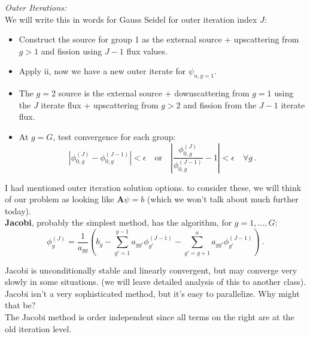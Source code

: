 \documentclass[12pt]{article}
\newcommand{\ve}[1]{\ensuremath{\mathbf{#1}}}
\begin{document}
\textit{Outer Iterations:} \\
We will write this in words for Gauss Seidel for outer iteration index $J$:
%
\begin{itemize}
\item Construct the source for group 1 as the external source + upscattering from $g>1$ and fission using $J-1$ flux values.
\item Apply ii, now we have a new outer iterate for $\psi_{n,g=1}$.
\item The $g=2$ source is the external source + downscattering from $g=1$ using the $J$ iterate flux + upscattering from $g>2$ and fission from the $J-1$ iterate flux. 
\item At $g=G$, test convergence for each group:
\[
|\phi_{0,g}^{(J)} - \phi_{0,g}^{(J-1)}| < \epsilon \quad \text{or} \quad |\frac{\phi_{0,g}^{(J)}}{\phi_{0,g}^{(J-1)}} - 1| < \epsilon \quad \forall g \:.
\]
\end{itemize}
I had mentioned outer iteration solution options. to consider these, we will think of our problem as looking like $\ve{A} \psi = b$ (which we won't talk about much further today).\\
\textbf{Jacobi}, probably the simplest method, 
%
has the algorithm, for $g = 1, \dots, G$:
\[\phi^{(J)}_g = \frac{1}{a_{gg}}(b_g - \sum_{g'=1}^{g-1} a_{gg'} \phi_{g'}^{(J-1)} - \sum_{g'=g+1}^{n} a_{gg'} \phi_{g'}^{(J-1)})\:.\]

Jacobi is unconditionally stable and linearly convergent, but may converge very slowly in some situations. (we will leave detailed analysis of this to another class). \\
%
%
Jacobi isn't a very sophisticated method, but it's easy to parallelize. Why might that be? \\The Jacobi method is order independent since all terms on the right are at the old iteration level. 
\end{document}
